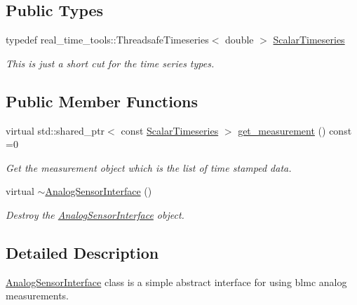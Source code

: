 \subsection*{Public Types}
\begin{DoxyCompactItemize}
\item 
\mbox{\label{classblmc__drivers_1_1AnalogSensorInterface_a4e4a853aa044b7d3afbaa3fe20477602}} 
typedef real\+\_\+time\+\_\+tools\+::\+Threadsafe\+Timeseries$<$ double $>$ \hyperlink{classblmc__drivers_1_1AnalogSensorInterface_a4e4a853aa044b7d3afbaa3fe20477602}{Scalar\+Timeseries}
\begin{DoxyCompactList}\small\item\em This is just a short cut for the time series types. \end{DoxyCompactList}\end{DoxyCompactItemize}
\subsection*{Public Member Functions}
\begin{DoxyCompactItemize}
\item 
virtual std\+::shared\+\_\+ptr$<$ const \hyperlink{classblmc__drivers_1_1AnalogSensorInterface_a4e4a853aa044b7d3afbaa3fe20477602}{Scalar\+Timeseries} $>$ \hyperlink{classblmc__drivers_1_1AnalogSensorInterface_afd694f79c9fec5a35984d468f59f315c}{get\+\_\+measurement} () const =0
\begin{DoxyCompactList}\small\item\em Get the measurement object which is the list of time stamped data. \end{DoxyCompactList}\item 
virtual \hyperlink{classblmc__drivers_1_1AnalogSensorInterface_a809cd9b86ae1cb9119a2ad025163afa9}{$\sim$\+Analog\+Sensor\+Interface} ()
\begin{DoxyCompactList}\small\item\em Destroy the \hyperlink{classblmc__drivers_1_1AnalogSensorInterface}{Analog\+Sensor\+Interface} object. \end{DoxyCompactList}\end{DoxyCompactItemize}


\subsection{Detailed Description}
\hyperlink{classblmc__drivers_1_1AnalogSensorInterface}{Analog\+Sensor\+Interface} class is a simple abstract interface for using blmc analog measurements. 

